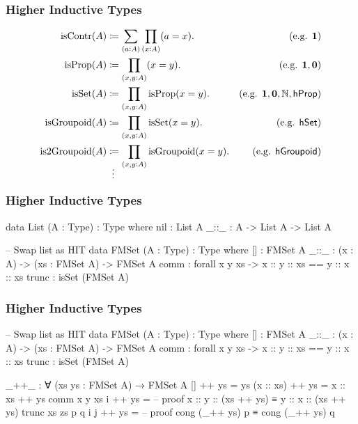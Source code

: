 \documentclass{beamer}
\begin{document}
\begin{frame}
\frametitle{Higher Inductive Types}

\begin{align*}
  \text{isContr}(A) & \coloneqq \sum_{(a:A)} \prod_{(x:A)} (a = x).
  & \text{(e.g. $\mathbf{1}$)} \\
  \text{isProp}(A) & \coloneqq \prod_{(x,y:A)} (x = y).
  & \text{(e.g. $\mathbf{1}, \mathbf{0}$)} \\
  \text{isSet}(A) & \coloneqq \prod_{(x,y:A)} \text{isProp}(x = y).
  & \text{(e.g. $\mathbf{1}, \mathbf{0}, \mathbb{N}, \mathsf{hProp}$)} \\
  \text{isGroupoid}(A) & \coloneqq \prod_{(x,y:A)} \text{isSet}(x = y).
  & \text{(e.g. $\mathsf{hSet}$)} \\
  \text{is2Groupoid}(A) & \coloneqq \prod_{(x,y:A)} \text{isGroupoid}(x = y).
  & \text{(e.g. $\mathsf{hGroupoid}$)} \\
  \shortvdotswithin{=}
\end{align*}

\end{frame}

\begin{frame}[fragile]
\frametitle{Higher Inductive Types}

\begin{code}
data List (A : Type) : Type where
  nil : List A
  _::_ : A -> List A -> List A

-- Swap list as HIT
data FMSet (A : Type) : Type where
  []    : FMSet A
  _::_  : (x : A) -> (xs : FMSet A) -> FMSet A
  comm  : forall x y xs -> x :: y :: xs == y :: x :: xs
  trunc : isSet (FMSet A)
\end{code}

\end{frame}

\begin{frame}[fragile]
\frametitle{Higher Inductive Types}

\begin{code}
-- Swap list as HIT
data FMSet (A : Type) : Type where
  []    : FMSet A
  _::_  : (x : A) -> (xs : FMSet A) -> FMSet A
  comm  : forall x y xs -> x :: y :: xs == y :: x :: xs
  trunc : isSet (FMSet A)

_++_ : ∀ (xs ys : FMSet A) → FMSet A
[] ++ ys = ys
(x :: xs) ++ ys = x :: xs ++ ys
comm x y xs i ++ ys =
  -- proof x :: y :: (xs ++ ys) ≡ y :: x :: (xs ++ ys)
trunc xs zs p q i j ++ ys =
  -- proof cong (_++ ys) p ≡ cong (_++ ys) q
\end{code}

\end{frame}
\end{document}
